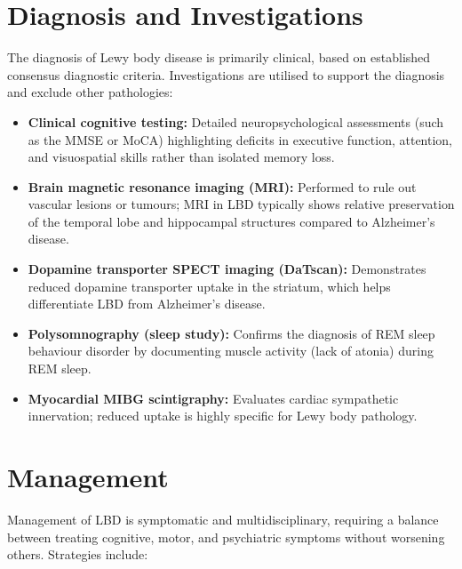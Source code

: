 \section*{Diagnosis and Investigations}
The diagnosis of Lewy body disease is primarily clinical, based on established consensus diagnostic criteria. Investigations are utilised to support the diagnosis and exclude other pathologies:

\begin{itemize}
    \item \textbf{Clinical cognitive testing:} Detailed neuropsychological assessments (such as the MMSE or MoCA) highlighting deficits in executive function, attention, and visuospatial skills rather than isolated memory loss.
    \item \textbf{Brain magnetic resonance imaging (MRI):} Performed to rule out vascular lesions or tumours; MRI in LBD typically shows relative preservation of the temporal lobe and hippocampal structures compared to Alzheimer's disease.
    \item \textbf{Dopamine transporter SPECT imaging (DaTscan):} Demonstrates reduced dopamine transporter uptake in the striatum, which helps differentiate LBD from Alzheimer's disease.
    \item \textbf{Polysomnography (sleep study):} Confirms the diagnosis of REM sleep behaviour disorder by documenting muscle activity (lack of atonia) during REM sleep.
    \item \textbf{Myocardial MIBG scintigraphy:} Evaluates cardiac sympathetic innervation; reduced uptake is highly specific for Lewy body pathology.
\end{itemize}

\section*{Management}
Management of LBD is symptomatic and multidisciplinary, requiring a balance between treating cognitive, motor, and psychiatric symptoms without worsening others. Strategies include:

